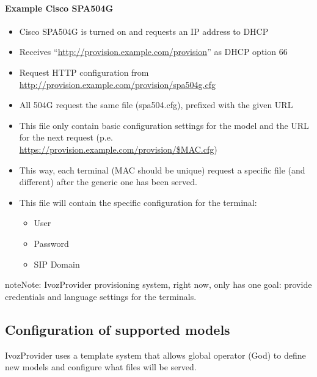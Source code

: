 \documentclass[letterpaper,10pt,english]{sphinxmanual}
\begin{document}
\paragraph{Example Cisco SPA504G}
\begin{itemize}
\item {} 
Cisco SPA504G is turned on and requests an IP address to DHCP

\item {} 
Receives “\url{http://provision.example.com/provision}” as DHCP option 66

\item {} 
Request HTTP configuration from \url{http://provision.example.com/provision/spa504g.cfg}

\item {} 
All 504G request the same file (spa504.cfg), prefixed with the given URL

\item {} 
This file only contain basic configuration settings for the model and the URL
for the next request (p.e. \url{https://provision.example.com/provision/\$MAC.cfg})

\item {} 
This way, each terminal (MAC should be unique) request a specific file
(and different) after the generic one has been served.

\item {} 
This file will contain the specific configuration for the terminal:
\begin{itemize}
\item {} 
User

\item {} 
Password

\item {} 
SIP Domain

\end{itemize}

\end{itemize}

\begin{notice}{note}{Note:}
IvozProvider provisioning system, right now, only has one goal:
provide credentials and language settings for the terminals.
\end{notice}


\subsection{Configuration of supported models}
\label{platform/terminal_provisioning:configuration-of-supported-models}
IvozProvider uses a template system that allows global operator (God) to
define new models and configure what files will be served.
\end{document}
